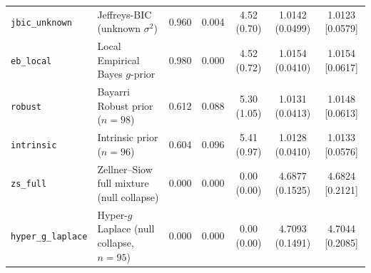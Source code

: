 \documentclass[11pt,a4paper]{article}
\begin{document}
\begin{table}[htbp]
{\begin{tabular}{llccccc}
\texttt{jbic\_unknown} & Jeffreys-BIC (unknown $\sigma^2$) & 0.960 & 0.004 & 4.52 (0.70) & 1.0142 (0.0499) & 1.0123 [0.0579] \\
\texttt{eb\_local} & Local Empirical Bayes $g$-prior & 0.980 & 0.000 & 4.52 (0.72) & 1.0154 (0.0410) & 1.0154 [0.0617] \\
\texttt{robust} & Bayarri Robust prior ($n=98$) & 0.612 & 0.088 & 5.30 (1.05) & 1.0131 (0.0413) & 1.0148 [0.0613] \\
\texttt{intrinsic} & Intrinsic prior ($n=96$) & 0.604 & 0.096 & 5.41 (0.97) & 1.0128 (0.0410) & 1.0133 [0.0576] \\
\texttt{zs\_full} & Zellner--Siow full mixture (null collapse) & 0.000 & 0.000 & 0.00 (0.00) & 4.6877 (0.1525) & 4.6824 [0.2121] \\
\texttt{hyper\_g\_laplace} & Hyper-$g$ Laplace (null collapse, $n=95$) & 0.000 & 0.000 & 0.00 (0.00) & 4.7093 (0.1491) & 4.7044 [0.2085] \\
\bottomrule
\end{tabular}%
}
\end{table}
\end{document}
